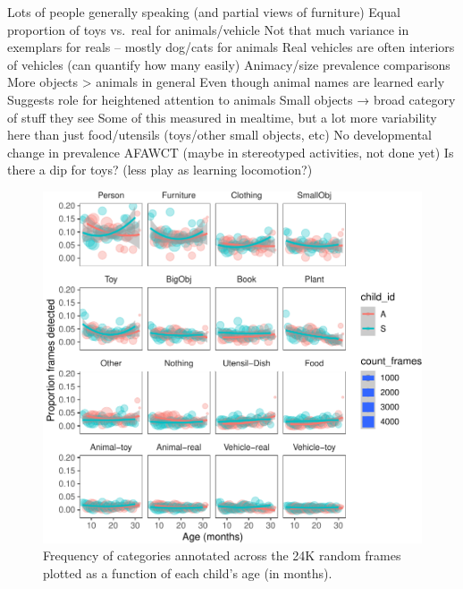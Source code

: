 \documentclass[10pt, letterpaper]{article}
\newenvironment{CodeChunk}{}{}
\begin{document}
Lots of people generally speaking (and partial views of furniture) Equal
proportion of toys vs.~real for animals/vehicle Not that much variance
in exemplars for reals -- mostly dog/cats for animals Real vehicles are
often interiors of vehicles (can quantify how many easily) Animacy/size
prevalence comparisons More objects \textgreater{} animals in general
Even though animal names are learned early Suggests role for heightened
attention to animals Small objects → broad category of stuff they see
Some of this measured in mealtime, but a lot more variability here than
just food/utensils (toys/other small objects, etc) No developmental
change in prevalence AFAWCT (maybe in stereotyped activities, not done
yet) Is there a dip for toys? (less play as learning locomotion?)

\begin{CodeChunk}
\begin{figure}[h]

{\centering \includegraphics{figs/freq_by_category-1} 

}

\caption[Frequency of categories annotated across the 24K random frames plotted as a function of each child's age (in months)]{Frequency of categories annotated across the 24K random frames plotted as a function of each child's age (in months).}\label{fig:freq_by_category}
\end{figure}
\end{CodeChunk}
\end{document}
